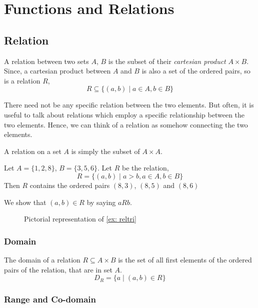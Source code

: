 \chapter{Functions and Relations}
\section{Relation}



A relation between two sets \(A\), \(B\) is the subset of their \emph{cartesian
product} \(A \times B\).
Since, a cartesian product between \(A\) and \(B\) is also a set of the ordered pairs, so
is a relation \(R\),\[
    R \subseteq \{(a,b) \mid a \in A, b \in B\}
\]

There need not be any specific relation between the two elements. But often, it is useful
to talk about relations which employ a specific relationship between the two elements.
Hence, we can think of a relation as somehow connecting the two elements.

A relation on a set \(A\) is simply the subset of \(A \times A\).

\begin{example}
    \label{ex: reltri}
    Let \(A = \{1,2,8\}\), \(B = \{3,5,6\}\). Let \(R\) be the relation, \[
        R = \{(a,b) \mid a > b, a \in A, b \in B\}
    \]
    Then \(R\) contains the ordered pairs \((8,3)\), \((8,5)\) and \((8,6)\)
\end{example}

We show that \((a,b) \in R\) by saying \(a R b\).

\begin{figure}[H]
    \centering
    \caption{Pictorial representation of \cref{ex: reltri}}
\end{figure}

\subsection{Domain}

The domain of a relation \(R \subseteq A \times B\) is the set of all first elements of 
the ordered pairs of the relation, that are in set \(A\). \[D_R = \{a \mid (a,b) \in R\}\]

\subsection{Range and Co-domain}

